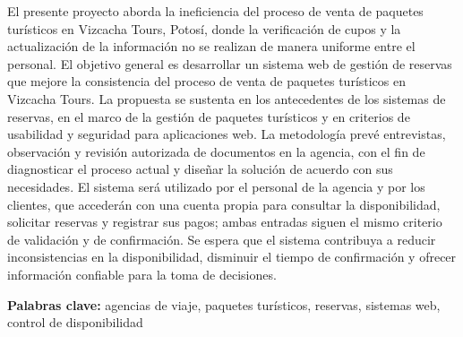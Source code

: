 
El presente proyecto aborda la ineficiencia del proceso de venta
de paquetes turísticos en Vizcacha Tours, Potosí, donde la verificación de
cupos y la actualización de la información no se realizan de manera uniforme
entre el personal. El objetivo general es desarrollar un sistema web de
gestión de reservas que mejore la consistencia del proceso de venta
de paquetes turísticos en Vizcacha Tours. La propuesta se sustenta en los
antecedentes de los sistemas de reservas, en el marco de la gestión de
paquetes turísticos y en criterios de usabilidad y seguridad para
aplicaciones web. La metodología prevé entrevistas, observación y revisión
autorizada de documentos en la agencia, con el fin de diagnosticar el proceso
actual y diseñar la solución de acuerdo con sus necesidades. El sistema será
utilizado por el personal de la agencia y por los clientes, que accederán con
una cuenta propia para consultar la disponibilidad, solicitar reservas y
registrar sus pagos; ambas entradas siguen el mismo criterio de validación y
de confirmación. Se espera que el sistema contribuya a reducir inconsistencias
en la disponibilidad, disminuir el tiempo de confirmación y ofrecer
información confiable para la toma de decisiones.

\vspace{0.5\baselineskip}
\noindent\textbf{Palabras clave:} agencias de viaje, paquetes turísticos,
reservas, sistemas web, control de disponibilidad
